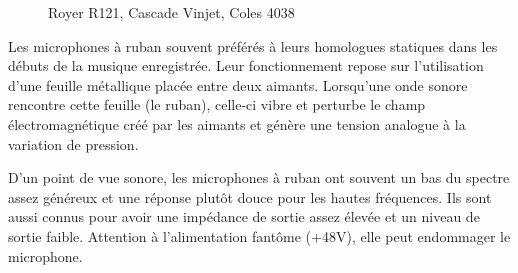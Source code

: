 \documentclass[
  letterpaper,
  DIV=11,
  numbers=noendperiod]{scrreprt}
\begin{document}
\begin{figure}
\begin{minipage}[t]{0.33\linewidth}
{{}

}

\end{minipage}%
%
\begin{minipage}[t]{0.33\linewidth}

{\centering 


}

\end{minipage}%

\caption{\label{fig-mic_rub}Royer R121, Cascade Vinjet, Coles 4038}

\end{figure}

Les microphones à ruban souvent préférés à leurs homologues statiques
dans les débuts de la musique enregistrée. Leur fonctionnement repose
sur l'utilisation d'une feuille métallique placée entre deux aimants.
Lorsqu'une onde sonore rencontre cette feuille (le ruban), celle-ci
vibre et perturbe le champ électromagnétique créé par les aimants et
génère une tension analogue à la variation de pression.

D'un point de vue sonore, les microphones à ruban ont souvent un bas du
spectre assez généreux et une réponse plutôt douce pour les hautes
fréquences. Ils sont aussi connus pour avoir une impédance de sortie
assez élevée et un niveau de sortie faible. Attention à l'alimentation
fantôme (+48V), elle peut endommager le microphone.
\end{document}
